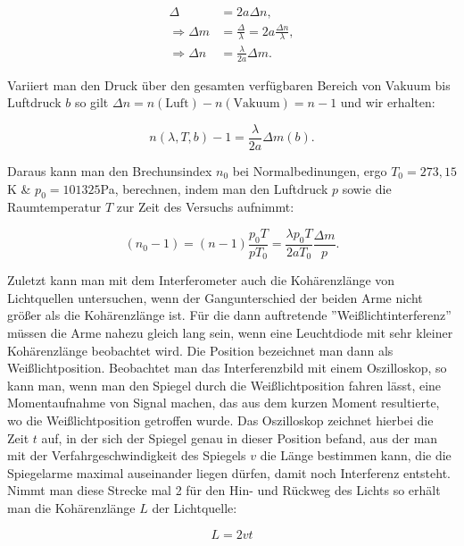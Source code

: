 \documentclass{article}
\begin{document}
\begin{equation}
    \begin{split}
        \Delta &= 2 a \Delta n, \\
        \Rightarrow \Delta m &= \frac{\Delta}{\lambda} = 2a \frac{\Delta n}{\lambda}, \\
        \Rightarrow \Delta n &= \frac{\lambda}{2a} \Delta m.
    \end{split}
\end{equation}

Variiert man den Druck über den gesamten verfügbaren Bereich von Vakuum bis Luftdruck $b$ so gilt $\Delta n = n(\text{Luft}) - n(\text{Vakuum}) =  n - 1 $ und wir erhalten:

\begin{equation}
    n(\lambda, T, b) - 1 = \frac{\lambda}{2a} \Delta m(b).
\end{equation}

Daraus kann man den Brechunsindex $n_0$ bei Normalbedinungen, ergo $T_0 = 273,15$K \& $p_0 = 101325$Pa, berechnen, indem man den Luftdruck $p$ sowie die Raumtemperatur $T$ zur Zeit des Versuchs aufnimmt:

\begin{equation}
    (n_0 - 1) = (n - 1) \frac{p_0 T}{p T_0} = \frac{\lambda p_0 T}{2 a T_0} \frac{\Delta m}{p}.
    \label{eq:1_BRECHUNGSINDEX_A2}
\end{equation}

Zuletzt kann man mit dem Interferometer auch die Kohärenzlänge von Lichtquellen untersuchen, wenn der Gangunterschied der beiden Arme nicht größer als die Kohärenzlänge ist. Für die dann auftretende ''Weißlichtinterferenz'' müssen die Arme nahezu gleich lang sein, wenn eine Leuchtdiode mit sehr kleiner Kohärenzlänge beobachtet wird. Die Position bezeichnet man dann als Weißlichtposition. Beobachtet man das Interferenzbild mit einem Oszilloskop, so kann man, wenn man den Spiegel durch die Weißlichtposition fahren lässt, eine Momentaufnahme von Signal machen, das aus dem kurzen Moment resultierte, wo die Weißlichtposition getroffen wurde. Das Oszilloskop zeichnet hierbei die Zeit $t$ auf, in der sich der Spiegel genau in dieser Position befand, aus der man mit der Verfahrgeschwindigkeit des Spiegels $v$ die Länge bestimmen kann, die die Spiegelarme maximal auseinander liegen dürfen, damit noch Interferenz entsteht. Nimmt man diese Strecke mal 2 für den Hin- und Rückweg des Lichts so erhält man die Kohärenzlänge $L$ der Lichtquelle:

\begin{equation}
    L = 2 v t
    \label{eq:1_Kohärenzlänge_A3}
\end{equation}
\end{document}
